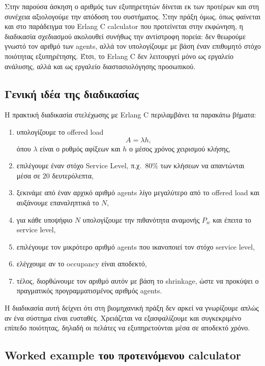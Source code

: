 \documentclass{article}
\begin{document}
Στην παρούσα άσκηση ο αριθμός των εξυπηρετητών δίνεται εκ των προτέρων και στη συνέχεια αξιολογούμε την απόδοση του συστήματος. Στην πράξη όμως, όπως φαίνεται και στο παράδειγμα του \foreignlanguage{english}{Erlang C calculator} που προτείνεται στην εκφώνηση, η διαδικασία σχεδιασμού ακολουθεί συνήθως την αντίστροφη πορεία: δεν θεωρούμε γνωστό τον αριθμό των agents, αλλά τον υπολογίζουμε με βάση έναν επιθυμητό στόχο ποιότητας εξυπηρέτησης. Έτσι, το Erlang C δεν λειτουργεί μόνο ως εργαλείο ανάλυσης, αλλά και ως εργαλείο διαστασιολόγησης προσωπικού.

\subsection{Γενική ιδέα της διαδικασίας}

Η πρακτική διαδικασία στελέχωσης με Erlang C περιλαμβάνει τα παρακάτω βήματα:
\begin{enumerate}
    \item υπολογίζουμε το offered load
    \[
    A = \lambda h,
    \]
    όπου $\lambda$ είναι ο ρυθμός αφίξεων και $h$ ο μέσος χρόνος χειρισμού κλήσης,
    \item επιλέγουμε έναν στόχο \foreignlanguage{english}{Service Level}, π.χ.\ $80\%$ των κλήσεων να απαντώνται μέσα σε $20$ δευτερόλεπτα,
    \item ξεκινάμε από έναν αρχικό αριθμό agents λίγο μεγαλύτερο από το offered load και αυξάνουμε επαναληπτικά το $N$,
    \item για κάθε υποψήφιο $N$ υπολογίζουμε την πιθανότητα αναμονής $P_w$ και έπειτα το service level,
    \item επιλέγουμε τον μικρότερο αριθμό agents που ικανοποιεί τον στόχο service level,
    \item ελέγχουμε αν το occupancy είναι αποδεκτό,
    \item τέλος, διορθώνουμε τον αριθμό αυτόν με βάση το shrinkage, ώστε να προκύψει ο πραγματικός προγραμματισμένος αριθμός agents.
\end{enumerate}

Η διαδικασία αυτή δείχνει ότι στη βιομηχανική πράξη δεν αρκεί να γνωρίζουμε απλώς αν ένα σύστημα είναι ευσταθές. Χρειάζεται να εξασφαλίζουμε και συγκεκριμένο επίπεδο ποιότητας, δηλαδή οι πελάτες να εξυπηρετούνται μέσα σε αποδεκτό χρόνο.

\subsection{Worked example του προτεινόμενου calculator}
\end{document}
